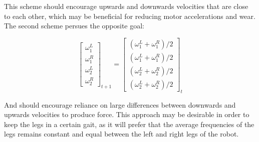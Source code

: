 This scheme should encourage upwards and downwards velocities that are close to each other, which may be beneficial for reducing motor accelerations and wear. The second scheme persues the opposite goal:

\begin{equation}
    \begin{bmatrix} \omega_1^L \\ \omega_1^R \\ \omega_2^L \\ \omega_2^R \end{bmatrix}_{t+1} = \begin{bmatrix} (\omega_1^L + \omega_1^R)/2 \\(\omega_1^L + \omega_1^R)/2 \\ (\omega_2^L + \omega_2^R)/2 \\ (\omega_2^L + \omega_2^R)/2 \end{bmatrix}_{t}
\end{equation}

\noindent And should encourage reliance on large differences between downwards and upwards velocities to produce force. This approach may be desirable in order to keep the legs in a certain gait, as it will prefer that the average frequencies of the legs remains constant and equal between the left and right legs of the robot. 

